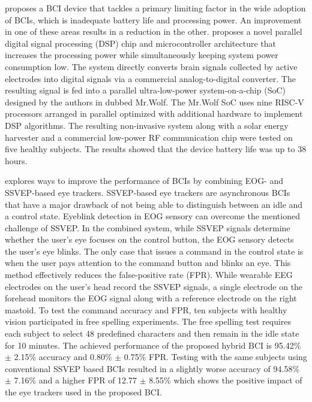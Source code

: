 \textcite{kartsch_biowolf_2019} proposes a BCI device that tackles a primary limiting factor in the wide adoption of BCIs, which is inadequate battery life and processing power. An improvement in one of these areas results in a reduction in the other. \textcite{kartsch_biowolf_2019} proposes a novel parallel digital signal processing (DSP) chip and microcontroller architecture that increases the processing power while simultaneously keeping system power consumption low. The system directly converts brain signals collected by active electrodes into digital signals via a commercial analog-to-digital converter. The resulting signal is fed into a parallel ultra-low-power system-on-a-chip (SoC) designed by the authors in \textcite{pullini_mr_2018} dubbed Mr.Wolf. The Mr.Wolf SoC uses nine RISC-V processors arranged in parallel optimized with additional hardware to implement DSP algorithms. The resulting non-invasive system along with a solar energy harvester and a commercial low-power RF communication chip were tested on five healthy subjects. The results showed that the device battery life was up to 38 hours.

\textcite{zhou_hybrid_2020} explores ways to improve the performance of BCIs by combining  EOG- and SSVEP-based eye trackers. SSVEP-based eye trackers are asynchronous BCIs that have a major drawback of not being able to distinguish between an idle and a control state. Eyeblink detection in EOG sensory can overcome the mentioned challenge of SSVEP. In the combined system, while SSVEP signals determine whether the user's eye focuses on the control button, the EOG sensory detects the user's eye blinks. The only case that issues a command in the control state is when the user pays attention to the command button and blinks an eye. This method effectively reduces the false-positive rate (FPR). While wearable EEG electrodes on the user's head record the SSVEP signals, a single electrode on the forehead monitors the EOG signal along with a reference electrode on the right mastoid. To test the command accuracy and FPR,  ten subjects with healthy vision participated in free spelling experiments. The free spelling test requires each subject to select 48 predefined characters and then remain in the idle state for 10 minutes. The achieved performance of the proposed hybrid BCI is 95.42\% $\pm$ 2.15\% accuracy and 0.80\% $\pm$ 0.75\% FPR. Testing with the same subjects using conventional SSVEP based BCIs resulted in a slightly worse accuracy of 94.58\% $\pm$ 7.16\% and a higher FPR of 12.77\％ $\pm$ 8.55\% which shows the positive impact of the eye trackers used in the proposed BCI. 

